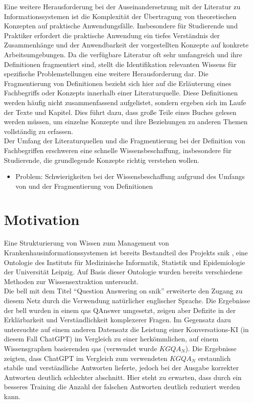 Eine weitere Herausforderung bei der Auseinandersetzung mit der Literatur zu Informationssystemen ist die Komplexität der Übertragung von theoretischen Konzepten auf praktische Anwendungsfälle.
Insbesondere für Studierende und Praktiker erfordert die praktische Anwendung ein tiefes Verständnis der Zusammenhänge und der Anwendbarkeit der vorgestellten Konzepte auf konkrete Arbeitsumgebungen.
Da die verfügbare Literatur oft sehr umfangreich und ihre Definitionen fragmentiert sind, stellt die Identifikation relevanten Wissens für spezifische Problemstellungen eine weitere Herausforderung dar.
Die Fragmentierung von Definitionen bezieht sich hier auf die Erläuterung eines Fachbegriffs oder Konzepts innerhalb einer Literaturquelle.
Diese Definitionen werden häufig nicht zusammenfassend aufgelistet, sondern ergeben sich im Laufe der Texte und Kapitel.
Dies führt dazu, dass große Teile eines Buches gelesen werden müssen, um einzelne Konzepte und ihre Beziehungen zu anderen Themen vollständig zu erfassen.\\

Der Umfang der Literaturquellen und die Fragmentierung bei der Definition von Fachbegriffen
erschweren eine schnelle Wissensbeschaffung, insbesondere für Studierende, die grundlegende Konzepte richtig verstehen wollen.\\

\begin{itemize}
  \item Problem: Schwierigkeiten bei der Wissensbeschaffung aufgrund des Umfangs von \citet{bb} und der Fragmentierung von Definitionen
\end{itemize}

\section{Motivation}

Eine Strukturierung von Wissen zum Management von Krankenhausinformationssystemen ist bereits Bestandteil des Projekts \ac{snik} \citep{semantischesnetz, domaene},
eine Ontologie des Instituts für Medizinische Informatik, Statistik und Epidemiologie der Universität Leipzig.
Auf Basis dieser Ontologie wurden bereits verschiedene Methoden zur Wissensextraktion untersucht.\\
Die \ac{bell} mit dem Titel \enquote{Question Answering on \ac{snik}} \citep{hannesbell} erweiterte den Zugang zu diesem Netz durch die Verwendung natürlicher englischer Sprache.
Die Ergebnisse der \ac{bell} wurden in einem \ac{qas} QAnswer \citep{qanswer} umgesetzt, zeigen aber Defizite in der Erklärbarkeit und Verständlichkeit komplexerer Fragen.
Im Gegensatz dazu untersuchte \citet{chatgpt_qas} auf einem anderen Datensatz die Leistung einer Konversations-KI (in diesem Fall ChatGPT) im Vergleich zu einer herkömmlichen, auf einem Wissensgraphen basierenden \ac{qas} (verwendet wurde $KGQA_N$).
Die Ergebnisse zeigten, dass ChatGPT im Vergleich zum verwendeten $KGQA_N$ erstaunlich stabile und verständliche Antworten lieferte, jedoch bei der Ausgabe korrekter Antworten deutlich schlechter abschnitt. Hier steht zu erwarten, dass durch ein besseres Training die Anzahl der falschen Antworten deutlich reduziert werden kann.\\

